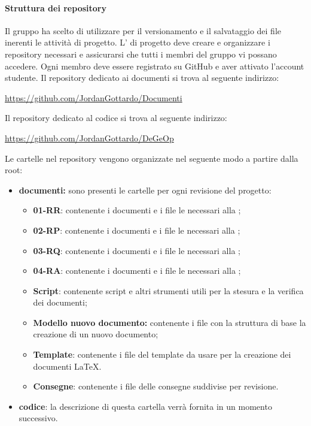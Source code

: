   \paragraph{Struttura dei repository}
  Il gruppo ha scelto di utilizzare  per il versionamento e il salvataggio dei file inerenti le attività di progetto. L'\amministratore{} di progetto deve creare e organizzare i repository necessari e assicurarsi che tutti i membri del gruppo vi possano accedere. Ogni membro deve essere registrato su GitHub e aver attivato l'account studente.
  \newline \newline
  Il repository dedicato ai documenti si trova al seguente indirizzo:
  \begin{center}
  	\url{https://github.com/JordanGottardo/Documenti}
  \end{center}
  Il repository dedicato al codice si trova al seguente indirizzo:
  \begin{center}
  	\url{https://github.com/JordanGottardo/DeGeOp}
  \end{center}
  Le cartelle nel repository vengono organizzate nel seguente modo a partire dalla root:
  \begin{itemize}
  	\item \textbf{documenti:} sono presenti le cartelle per ogni revisione del progetto:
  	\begin{itemize}
  		\item \textbf{01-RR}: contenente i documenti e i file le necessari alla \revereq;
  		\item \textbf{02-RP}: contenente i documenti e i file le necessari alla \revprog;
  		\item \textbf{03-RQ}: contenente i documenti e i file le necessari alla \revaqual;
  		\item \textbf{04-RA}: contenente i documenti e i file le necessari alla \revacc;
  		\item \textbf{Script}: contenente script e altri strumenti utili per la stesura e la verifica dei documenti;
  		\item \textbf{Modello nuovo documento:} contenente i file con la struttura di base la creazione di un nuovo documento;
  		\item \textbf{Template}: contenente i file del template da usare per la creazione dei documenti \LaTeX.
  		\item \textbf{Consegne}: contenente i file delle consegne suddivise per revisione.
  	\end{itemize}
  	\item \textbf{codice}: la descrizione di questa cartella verrà fornita in un momento successivo.
  \end{itemize}
  
